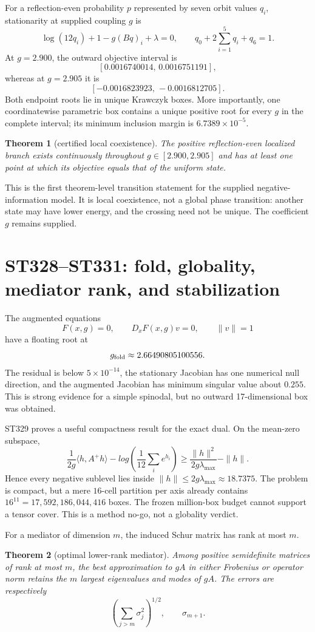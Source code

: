 \documentclass[11pt,a4paper]{article}
\newtheorem{theorem}{Theorem}[section]
\begin{document}
For a reflection-even probability $p$ represented by seven orbit values $q_i$, stationarity
at supplied coupling $g$ is
\[
\log(12q_i)+1-g(Bq)_i+\lambda=0,
\qquad q_0+2\sum_{i=1}^{5}q_i+q_6=1.
\]
At $g=2.900$, the outward objective interval is
\[
[0.0016740014,\,0.0016751191],
\]
whereas at $g=2.905$ it is
\[
[-0.0016823923,\,-0.0016812705].
\]
Both endpoint roots lie in unique Krawczyk boxes. More importantly, one coordinatewise
parametric box contains a unique positive root for every $g$ in the complete interval; its
minimum inclusion margin is $6.7389\times10^{-5}$.

\begin{theorem}[certified local coexistence]
The positive reflection-even localized branch exists continuously throughout
$g\in[2.900,2.905]$ and has at least one point at which its objective equals that of the
uniform state.
\end{theorem}

This is the first theorem-level transition statement for the supplied negative-information
model. It is local coexistence, not a global phase transition: another state may have lower
energy, and the crossing need not be unique. The coefficient $g$ remains supplied.

\section{ST328--ST331: fold, globality, mediator rank, and stabilization}

The augmented equations
\[
F(x,g)=0,\qquad D_xF(x,g)v=0,\qquad \|v\|=1
\]
have a floating root at
\[
g_{\rm fold}\approx2.66490805100556.
\]
The residual is below $5\times10^{-14}$, the stationary Jacobian has one numerical null
direction, and the augmented Jacobian has minimum singular value about $0.255$. This is
strong evidence for a simple spinodal, but no outward 17-dimensional box was obtained.

ST329 proves a useful compactness result for the exact dual. On the mean-zero subspace,
\[
\frac1{2g}\langle h,A^+h\rangle-log\left(\frac1{12}\sum_i e^{h_i}\right)
\ge \frac{\|h\|^2}{2g\lambda_{\max}}-\|h\|.
\]
Hence every negative sublevel lies inside $\|h\|\le2g\lambda_{\max}\approx18.7375$.
The problem is compact, but a mere $16$-cell partition per axis already contains
$16^{11}=17{,}592{,}186{,}044{,}416$ boxes. The frozen million-box budget cannot support a
tensor cover. This is a method no-go, not a globality verdict.

For a mediator of dimension $m$, the induced Schur matrix has rank at most $m$.
\begin{theorem}[optimal lower-rank mediator]
Among positive semidefinite matrices of rank at most $m$, the best approximation to $gA$
in either Frobenius or operator norm retains the $m$ largest eigenvalues and modes of $gA$.
The errors are respectively
\[
\left(\sum_{j>m}\sigma_j^2\right)^{1/2},\qquad \sigma_{m+1}.
\]
\end{theorem}
\end{document}
